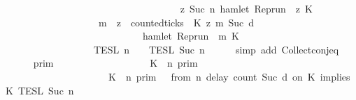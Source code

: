 \begin{isabellebody}
\ \ \ \ \ \ \ \ \ \ \ \ \ \ \ \ \ \ {\isacharparenright}\isanewline
\ \ \ \ \ \ \ \ \ \ \ \ \ \ \ \ {\isasyminter}\ {\isacharbraceleft}{\isasymrho}{\isachardot}\ {\isasymforall}z{\isasymge}\ Suc\ n{\isachardot}\ hamlet\ {\isacharparenleft}{\isacharparenleft}Rep{\isacharunderscore}run\ {\isasymrho}{\isacharparenright}\ z\ K\ {\isasymlongrightarrow}\isanewline
\ \ \ \ \ \ \ \ \ \ \ \ \ \ \ \ \ \ \ \ {\isacharparenleft}{\isasymforall}m\ {\isasymge}\ z{\isachardot}\ \ counted{\isacharunderscore}ticks\ {\isasymrho}\ K\ z\ m\ {\isacharparenleft}Suc\ d{\isacharparenright}\isanewline
\ \ \ \ \ \ \ \ \ \ \ \ \ \ \ \ \ \ \ \ \ \ \ \ \ \ \ \ {\isasymlongrightarrow}\ hamlet\ {\isacharparenleft}{\isacharparenleft}Rep{\isacharunderscore}run\ {\isasymrho}{\isacharparenright}\ m\ K\ {\isacharbraceright}\isanewline
\ \ \ \ \ \ \ \ \ \ \ \ \ \ \ \ {\isasyminter}\ {\isasymlbrakk}{\isasymlbrakk}\ {\isasymPsi}\ {\isasymrbrakk}{\isasymrbrakk}\isactrlsub T\isactrlsub E\isactrlsub S\isactrlsub L\isactrlbsup {\isasymge}\ n\isactrlesup \ {\isasyminter}\ {\isasymlbrakk}{\isasymlbrakk}\ {\isasymPhi}\ {\isasymrbrakk}{\isasymrbrakk}\isactrlsub T\isactrlsub E\isactrlsub S\isactrlsub L\isactrlbsup {\isasymge}\ Suc\ n\isactrlesup {\isacartoucheclose}\isanewline
\ \ \ \ \isamarkupfalse%
\ {\isacharparenleft}simp\ add{\isacharcolon}\ Collect{\isacharunderscore}conj{\isacharunderscore}eq{\isacharparenright}\isanewline
\ \ \isamarkupfalse%
\ \isamarkupfalse%
\ {\isacartoucheopen}{\isachardot}{\isachardot}{\isachardot}\ {\isacharequal}\ {\isasymlbrakk}{\isasymlbrakk}\ {\isasymGamma}\ {\isasymrbrakk}{\isasymrbrakk}\isactrlsub p\isactrlsub r\isactrlsub i\isactrlsub m\ \isanewline
\ \ \ \ \ \ \ \ \ \ \ \ \ \ \ \ {\isasyminter}\ {\isacharparenleft}{\isasymlbrakk}\ K\ {\isasymnot}{\isasymUp}\ n\ {\isasymrbrakk}\isactrlsub p\isactrlsub r\isactrlsub i\isactrlsub m\ \isanewline
\ \ \ \ \ \ \ \ \ \ \ \ \ \ \ \ \ \ \ \ {\isasymunion}\ {\isacharparenleft}{\isasymlbrakk}\ K\ {\isasymUp}\ n\ {\isasymrbrakk}\isactrlsub p\isactrlsub r\isactrlsub i\isactrlsub m\ {\isasyminter}\ {\isasymlbrakk}\ from\ n\ delay\ count\ {\isacharparenleft}Suc\ d{\isacharparenright}\ on\ K\ implies\ K\ {\isasymrbrakk}\isactrlsub T\isactrlsub E\isactrlsub S\isactrlsub L\isactrlbsup {\isasymge}\ Suc\ n\isactrlesup {\isacharparenright}\isanewline

\end{isabellebody}
